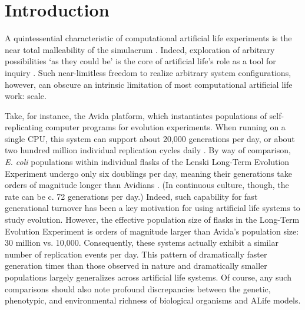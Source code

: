 \section{Introduction}

A quintessential characteristic of computational artificial life experiments is the near total malleability of the simulacrum \citep{pattee1989simulations}.
Indeed, exploration of arbitrary possibilities `as they could be' is the core of artificial life's role as a tool for inquiry \citep{langton1997artificial}.
Such near-limitless freedom to realize arbitrary system configurations, however, can obscure an intrinsic limitation of most computational artificial life work: scale.

Take, for instance, the Avida platform, which instantiates populations of self-replicating computer programs for evolution experiments.
When running on a single CPU, this system can support about 20,000 generations per day, or about two hundred million individual replication cycles daily \citep{ofria2009artificial}.
By way of comparison, \textit{E. coli} populations within individual flasks of the Lenski Long-Term Evolution Experiment undergo only six doublings per day, meaning their generations take orders of magnitude longer than Avidians \citep{good2017dynamics}.
(In continuous culture, though, the rate can be c. 72 generations per day.)
Indeed, such capability for fast generational turnover has been a key motivation for using artificial life systems to study evolution.
However, the effective population size of flasks in the Long-Term Evolution Experiment is orders of magnitude larger than Avida's population size: 30 million vs. 10,000.
Consequently, these systems actually exhibit a similar number of replication events per day.
This pattern of dramatically faster generation times than those observed in nature and dramatically smaller populations largely generalizes across artificial life systems.
Of course, any such comparisons should also note profound discrepancies between the genetic, phenotypic, and environmental richness of biological organisms and ALife models.

